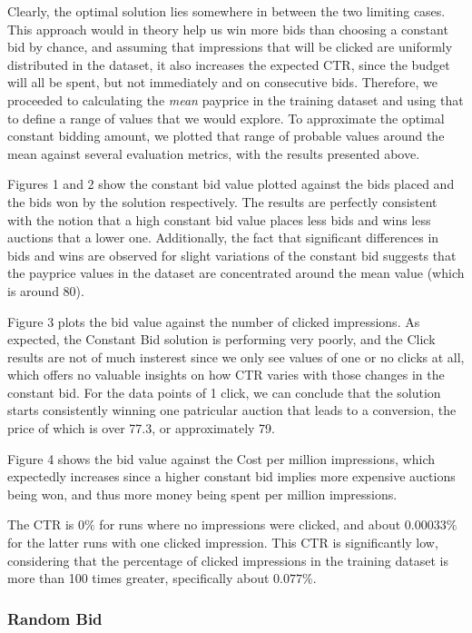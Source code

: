\documentclass{sig-alternate-05-2015}
\begin{document}
Clearly, the optimal solution lies somewhere in between the two limiting cases. This approach would in theory help us win more bids than choosing a constant bid by chance, and assuming that impressions that will be clicked are uniformly distributed in the dataset, it also increases the expected CTR, since the budget will all be spent, but not immediately and on consecutive bids. Therefore, we proceeded to calculating the \textit{mean} payprice in the training dataset and using that to define a range of values that we would explore. To approximate the optimal constant bidding amount, we plotted that range of probable values around the mean against several evaluation metrics, with the results presented above.

Figures 1 and 2 show the constant bid value plotted against the bids placed and the bids won by the solution respectively. The results are perfectly consistent with the notion that a high constant bid value places less bids and wins less auctions that a lower one. Additionally, the fact that significant differences in bids and wins are observed for slight variations of the constant bid suggests that the payprice values in the dataset are concentrated around the mean value (which is around 80).

Figure 3 plots the bid value against the number of clicked impressions. As expected, the Constant Bid solution is performing very poorly, and the Click results are not of much insterest since we only see values of one or no clicks at all, which offers no valuable insights on how CTR varies with those changes in the constant bid. For the data points of 1 click, we can conclude that the solution starts consistently winning one patricular auction that leads to a conversion, the price of which is over 77.3, or approximately 79.

Figure 4 shows the bid value against the Cost per million impressions, which expectedly increases since a higher constant bid implies more expensive auctions being won, and thus more money being spent per million impressions.

The CTR is $0\%$ for runs where no impressions were clicked, and about $0.00033\%$ for the latter runs with one clicked impression. This CTR is significantly low, considering that the percentage of clicked impressions in the training dataset is more than 100 times greater, specifically about $0.077\%$.

\subsubsection{Random Bid}
\end{document}
